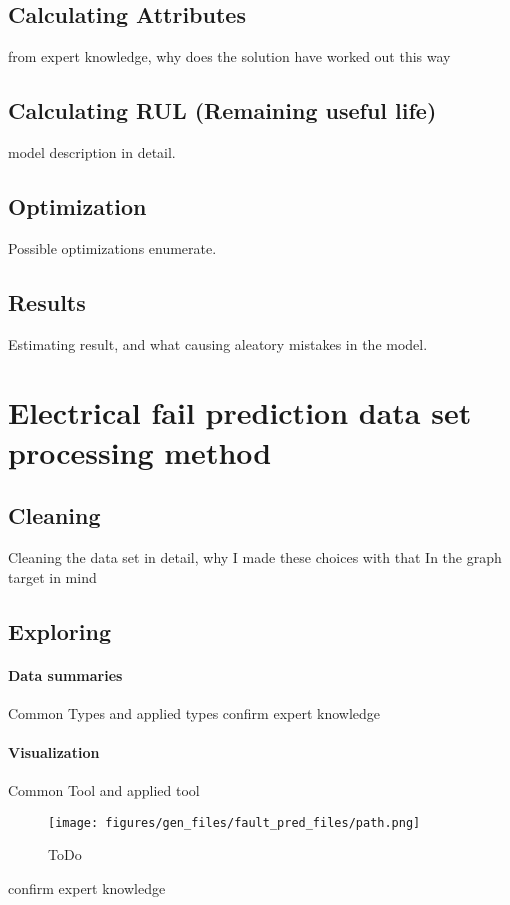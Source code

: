 \subsection{Calculating Attributes}
	from expert knowledge, why does the solution have worked out this way
\subsection{Calculating RUL (Remaining useful life)}
	model description in detail.
\subsection{Optimization}
Possible optimizations enumerate.
\subsection{Results}
Estimating result, and what causing aleatory mistakes in the model. 
\section{Electrical fail prediction data set processing method}
	\subsection{Cleaning}
Cleaning the data set in detail, why I made these choices with that In the graph target in mind
	\subsection{Exploring}
		\paragraph{Data summaries}
		Common Types and applied types
		confirm expert knowledge
		\paragraph{Visualization}
		Common Tool and applied tool
			\begin{figure}[!ht]
			\centering
			\texttt{[image: figures/gen\_files/fault\_pred\_files/path.png]}
			\caption{ToDo} 
			\end{figure}
		confirm expert knowledge

